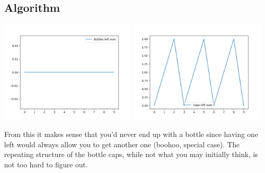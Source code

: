 \documentclass[letterpaper, 12pt]{article}
\begin{document}
\subsection{Algorithm}

\begin{center}
    \includegraphics[width=0.49\textwidth]{./python/bots1.png}
    \includegraphics[width=0.49\textwidth]{./python/caps1.png}
\end{center}
From this it makes sense that you'd never end up with a bottle since having one left would always allow you to get another one (boohoo, special case).
The repeating structure of the bottle caps, while not what you may initially think, is not too hard to figure out.
\end{document}
